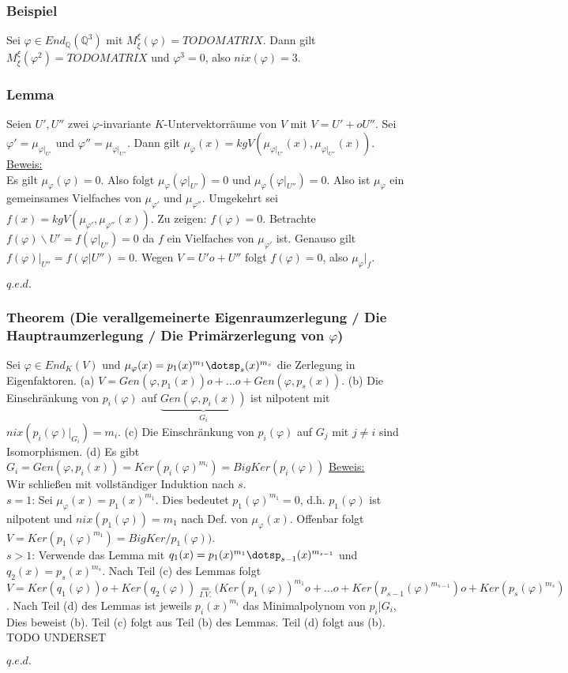 \documentclass[a4paper]{article}
\newcommand{\ul}{\underline}
\renewcommand{\qed}{\begin{flushright}
\ul{\(q.e.d.\)}
\end{flushright}}
\let\phi\varphi
\begin{document}
\subsubsection{Beispiel}
Sei \(\phi\in End_\mathbb{Q}(\mathbb{Q}^3)\) mit \(M_\xi^\xi(\phi)= TODO MATRIX\). Dann gilt \(M_\xi^\xi(\phi^2)=TODO MATRIX\) und \(\phi^3=0\), also \(nix(\phi)=3\).
\subsubsection{Lemma}
Seien \(U', U''\) zwei \(\phi\)-invariante \(K\)-Untervektorräume von \(V\) mit \(V=U' +o U''\).
Sei \(\phi'=\mu_{\phi \Big|_{U'}}\) und \(\phi''=\mu_{\phi \Big|_{U''}}\). Dann gilt \(\mu_\phi(x)=kgV(\mu_{\phi \Big|_{U'}}(x),\mu_{\phi \Big|_{U''}}(x))\).\\
\ul{Beweis:}\\
Es gilt \(\mu_\phi(\phi)=0\). Also folgt \(\mu_\phi(\phi\Big|_{U'})=0\) und \(\mu_\phi(\phi \Big|_{U''})=0\). Also ist \(\mu_\phi\) ein gemeinsames Vielfaches von \(\mu_{\phi'}\) und \(\mu_{\phi''}\). Umgekehrt sei \(f(x)=kgV(\mu_{\phi'},\mu_{\phi''}(x))\). Zu zeigen: \(f(\phi)=0\). Betrachte \(f(\phi)\backslash U'=f(\phi \Big|_{U'})=0\) da \(f\) ein Vielfaches von \(\mu_{\phi'}\) ist. Genauso gilt \(f(\phi) \Big|_{U''}=f(\phi|U'')=0\). Wegen \(V=U' o+ U''\) folgt \(f(\phi)=0\), also \(\mu_\phi \Big|_{f}\).
\qed
\subsubsection{Theorem (Die verallgemeinerte Eigenraumzerlegung / Die Hauptraumzerlegung / Die Primärzerlegung von \(\phi\))}
Sei \(\phi\in End_K(V)\) und \(\mu_\phi(x)=p_1(x)^{m_1}\dotsp_s(x)^{m_s}\) die Zerlegung in Eigenfaktoren.
(a) \(V=Gen(\phi,p_1(x)) o+ \dots o+ Gen(\phi, p_s(x))\).
(b) Die Einschränkung von \(p_i(\phi)\) auf \(\underbrace{Gen(\phi,p_i(x))}_{G_i}\) ist nilpotent mit \(nix(p_i(\phi)\Big|_{G_i})=m_i\).
(c) Die Einschränkung von \(p_i(\phi)\) auf \(G_j\) mit \(j \neq i\) sind Isomorphismen.
(d) Es gibt \(G_i=Gen(\phi,p_i(x))=Ker(p_i(\phi)^{m_i})=BigKer(p_i(\phi))\)
\ul{Beweis:}\\
Wir schließen mit vollständiger Induktion nach \(s\).\\
\ul{\(s=1\)}: Sei \(\mu_\phi(x)=p_1(x)^{m_1}\). Dies bedeutet \(p_1(\phi)^{m_1}=0\), d.h. \(p_1(\phi)\) ist nilpotent und \(nix(p_1(\phi))=m_1\) nach Def. von \(\mu_\phi(x)\). Offenbar folgt \(V=Ker(p_1(\phi)^{m_1})=BigKer/p_1(\phi))\).\\
\ul{\(s > 1\)}: Verwende das Lemma mit \(q_1(x)=p_1(x)^{m_1}\dotsp_{s-1}(x)^{m_{s-1}}\) und \(q_2(x)=p_s(x)^{m_s}\). Nach Teil (c) des Lemmas folgt \(V=Ker(q_1(\phi)) o+ Ker(q_2(\phi))\underset{I.V.}{=}(Ker(p_1(\phi))^{m_1} o+ \dots o+ Ker(p_{s-1}(\phi)^{m_{s-1}}) o+ Ker(p_s(\phi)^{m_s})\). Nach Teil (d) des Lemmas ist jeweils \(p_i(x)^{m_i}\) das Minimalpolynom von \(p_i|G_i\), Dies beweist (b). Teil (c) folgt aus Teil (b) des Lemmas. Teil (d) folgt aus (b).
TODO UNDERSET
\qed
\end{document}
